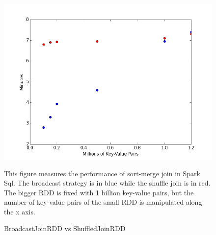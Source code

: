 \begin{figure}[h]
\begin{center}
\includegraphics[scale=0.6]{./img/final.png}
\caption{BroadcastJoinRDD vs ShuffledJoinRDD}
\label{fig:final}
\end{center}
This figure measures the performance of sort-merge join in Spark Sql.
The broadcast strategy is in blue while the shuffle join is in red. The bigger RDD is fixed with 1 billion key-value pairs, but the 
number of key-value pairs of the small RDD is manipulated along the x axis.  
\end{figure}





